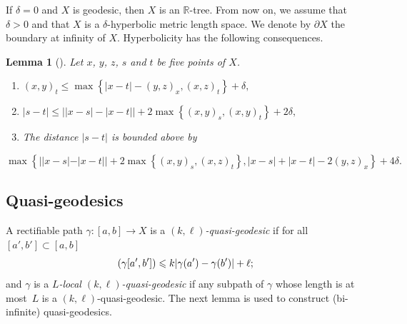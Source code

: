 \documentclass[JEP,XML,SOM,Unicode, NoEqCountersInSection,published]{cedram}
\newcommand{\NoChangel}[1]{%
\expandafter\let\csname old\string#1\endcsname=#1
\let#1=\relax
\newcommand{#1}{\mathcode`l="716C\csname old\string#1\endcsname\mathcode`l="7160 }%
}
\theoremstyle{plain}
\newtheorem{lem}[thm]{Lemma}
\theoremstyle{definition}
\DeclareMathOperator{\length}{length}\NoChangel{\length}
\begin{document}
If $\delta=0$ and $X$ is geodesic, then $X$ is an $\mathbb{R}$-tree.
From now on, we assume that $\delta>0$ and that $X$ is a $\delta$-hyperbolic metric length space.
We denote by $\partial X$ the boundary at infinity of $X$.
Hyperbolicity has the following consequences.
\begin{lem}[{\cite[Lem.\,2.2]{coulon_geometry_2014}}]
\label{res: metric inequalities}
Let $x$, $y$, $z$, $s$ and $t$ be five points of $X$.
\begin{enumerate}
\item \label{enu: metric inequalities - thin triangle}
\begin{math}
(x,y)_t \leq \max \left\{ |x - t| - (y,z)_x , (x,z)_t \right\} + \delta,
\end{math}
\item \label{enu: metric inequalities - two points close to a geodesic}
\begin{math}
|s-t| \leq \left| |x-s| - |x-t| \right| + 2\max\left\{ (x,y)_s, (x,y)_t\right\} + 2\delta,
\end{math}
\item \label{enu: metric inequalities - comparison tripod} The distance $|s-t|$ is bounded above by
\end{enumerate}
\begin{displaymath}
\max\left\{| |x-s| - |x-t|| + 2\max \left\{ (x,y)_s,(x,z)_t\right\}, |x-s| + |x-t| - 2 (y,z)_x \right\} + 4\delta.
\end{displaymath}
\end{lem}

\subsection{Quasi-geodesics}
\label{sec: quasi-geodesics}
A rectifiable path $\gamma:[a,b]\to X$ is a \emph{$(k,\ell)$-quasi-geodesic} if for all $[a',b']\subset [a,b]$
\[
\length(\gamma[a',b'])\leqslant k |\gamma(a')-\gamma(b')|+\ell;
\]
and $\gamma$ is a \emph{$L$-local $(k,\ell)$-quasi-geodesic} if any subpath of $\gamma$ whose length is at most~$L$ is a $(k,\ell)$-quasi-geodesic.
The next lemma is used to construct (bi-infinite) quasi-geodesics.
\end{document}
